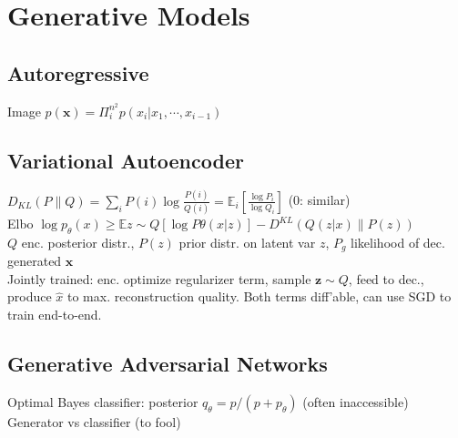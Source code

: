 \section{Generative Models}
\subsection*{Autoregressive}
Image $p(\mathbf{x})=\Pi_i^{n^2}p(x_i|x_1,\cdots,x_{i-1})$ \\

\subsection*{Variational Autoencoder}
$D_{KL}(P\|Q)=\sum_i P(i)\log\frac{P(i)}{Q(i)}=\mathbb{E}_i [\frac{\log P_i}{\log Q_i}]$ (0: similar) \\
Elbo $\log{p_\theta(x)} \ge \mathbb{E}{z\sim Q}[{\log P\theta(x|z)}]-D^{\mathit{KL}  }(Q(z|x)\|P(z))$ \\
$Q$ enc. posterior distr., $P(z)$ prior distr. on latent var $z$, $P_g$ likelihood of dec. generated $\mathbf{x}$ \\
Jointly trained: enc. optimize regularizer term, sample $\mathbf{z}\sim Q$, feed to dec., produce $\hat{x}$ to max. reconstruction quality. Both terms diff'able, can use SGD to train end-to-end.

\subsection*{Generative Adversarial Networks}
Optimal Bayes classifier: posterior $ q_\theta = p/(p + p_\theta) $ (often inaccessible)
Generator vs classifier (to fool)

